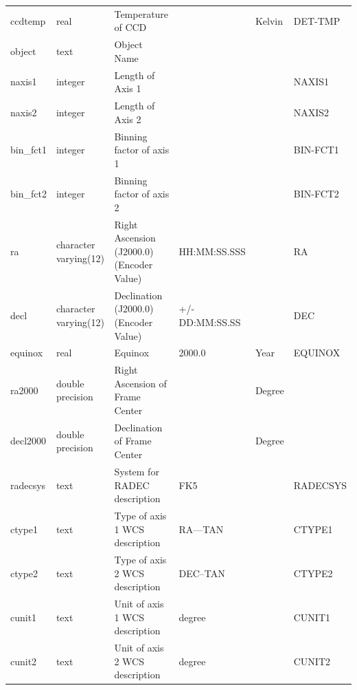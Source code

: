 \documentclass[12pt]{article}
\begin{document}
\begin{table}[thbp]
\begin{center}
{\begin{tabular}{llllll}
ccdtemp & real & Temperature of CCD                                  &                            & Kelvin      & DET-TMP  \\
object & text & Object Name                                         &                            &             &   \\
naxis1 & integer & Length of Axis 1                                    &                            &             & NAXIS1  \\
naxis2 & integer & Length of Axis 2                                    &                            &             & NAXIS2  \\
bin\_fct1 & integer & Binning factor of axis 1                            &                            &             & BIN-FCT1  \\
bin\_fct2 & integer & Binning factor of axis 2                            &                            &             & BIN-FCT2  \\
ra & character varying(12) & Right Ascension (J2000.0) (Encoder Value)           & HH:MM:SS.SSS               &             & RA  \\
decl & character varying(12) & Declination (J2000.0) (Encoder Value)               & +/-DD:MM:SS.SS             &             & DEC  \\
equinox & real & Equinox                                             & 2000.0                     & Year        & EQUINOX  \\
ra2000 & double precision & Right Ascension of Frame Center                     &                            & Degree      &   \\
decl2000 & double precision & Declination of Frame Center                         &                            & Degree      &   \\
radecsys & text & System for RADEC description                        & FK5                        &             & RADECSYS  \\
ctype1 & text & Type of axis 1 WCS description                      & RA---TAN                   &             & CTYPE1  \\
ctype2 & text & Type of axis 2 WCS description                      & DEC--TAN                   &             & CTYPE2  \\
cunit1 & text & Unit of axis 1 WCS description                      & degree                     &             & CUNIT1  \\
cunit2 & text & Unit of axis 2 WCS description                      & degree                     &             & CUNIT2  \\

\end{tabular}}
\end{center}
\end{table}
\end{document}
